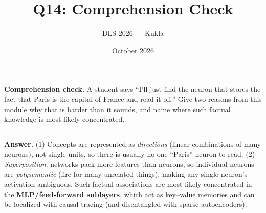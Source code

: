 \documentclass[11pt]{article}
\title{Q14: Comprehension Check}
\author{DLS 2026 --- Kukla}
\date{October 2026}
\begin{document}
\maketitle
\textbf{Comprehension check.} A student says ``I'll just find the neuron that stores the fact that Paris
is the capital of France and read it off.'' Give two reasons from this module why that is harder than it
sounds, and name where such factual knowledge is most likely concentrated.

\vspace{0.8cm}\hrule\vspace{4pt}
{\small\textbf{Answer.} (1) Concepts are represented as \emph{directions} (linear combinations of many
neurons), not single units, so there is usually no one ``Paris'' neuron to read. (2) \emph{Superposition}:
networks pack more features than neurons, so individual neurons are \emph{polysemantic} (fire for many
unrelated things), making any single neuron's activation ambiguous. Such factual associations are most
likely concentrated in the \textbf{MLP/feed-forward sublayers}, which act as key--value memories and can be
localized with causal tracing (and disentangled with sparse autoencoders).}
\end{document}
